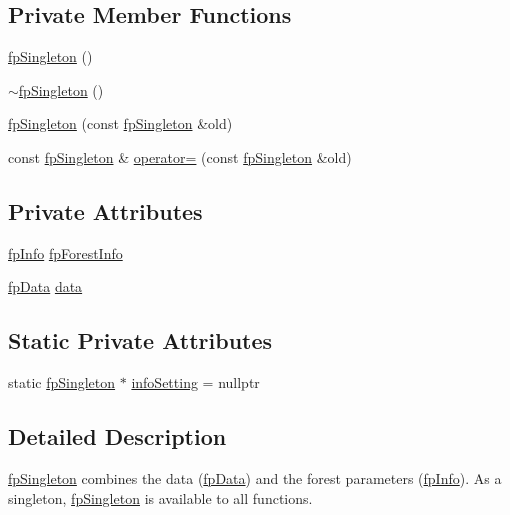 \subsection*{Private Member Functions}
\begin{DoxyCompactItemize}
\item 
\hyperlink{classfp_1_1fpSingleton_a049e41d4468d9b9f1e08788592c5f4cd}{fp\+Singleton} ()
\item 
\hyperlink{classfp_1_1fpSingleton_a5ea4d9f5a5811e9d9a64581dea9f561a}{$\sim$fp\+Singleton} ()
\item 
\hyperlink{classfp_1_1fpSingleton_afa7b24ca92c18b7e0f444592c9d8ba30}{fp\+Singleton} (const \hyperlink{classfp_1_1fpSingleton}{fp\+Singleton} \&old)
\item 
const \hyperlink{classfp_1_1fpSingleton}{fp\+Singleton} \& \hyperlink{classfp_1_1fpSingleton_a342b8b19aa98af5b2f56210cf0b164b0}{operator=} (const \hyperlink{classfp_1_1fpSingleton}{fp\+Singleton} \&old)
\end{DoxyCompactItemize}
\subsection*{Private Attributes}
\begin{DoxyCompactItemize}
\item 
\hyperlink{classfp_1_1fpInfo}{fp\+Info} \hyperlink{classfp_1_1fpSingleton_a85965009befa72a749ae498fa5b6ccfa}{fp\+Forest\+Info}
\item 
\hyperlink{classfp_1_1fpData}{fp\+Data} \hyperlink{classfp_1_1fpSingleton_a2fa16ac6a0f66641749032eeee61b8e9}{data}
\end{DoxyCompactItemize}
\subsection*{Static Private Attributes}
\begin{DoxyCompactItemize}
\item 
static \hyperlink{classfp_1_1fpSingleton}{fp\+Singleton} $\ast$ \hyperlink{classfp_1_1fpSingleton_a0e2c02e7e7f730f59e5c1f10005d581c}{info\+Setting} = nullptr
\end{DoxyCompactItemize}


\subsection{Detailed Description}
\hyperlink{classfp_1_1fpSingleton}{fp\+Singleton} combines the data (\hyperlink{classfp_1_1fpData}{fp\+Data}) and the forest parameters (\hyperlink{classfp_1_1fpInfo}{fp\+Info}). As a singleton, \hyperlink{classfp_1_1fpSingleton}{fp\+Singleton} is available to all functions. 

